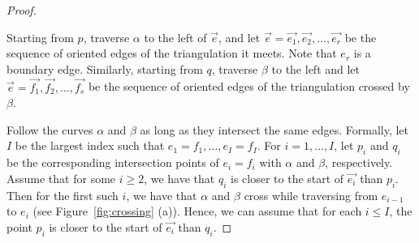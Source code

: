 \documentclass[11pt]{amsart}
\theoremstyle{definition}
\begin{document}
\begin{proof}
\begin{minipage}[t]{0.3\textwidth}
\endgroup

\label{fig:crossing}
\end{minipage}\hfill
\begin{minipage}[t]{0.65\textwidth}
\setlength{\parskip}{0pt}
\setlength{\parindent}{\normalparindent}\indent
Starting from $p$, traverse $\alpha$ to the left of $\vec{e}$, and let $\vec{e}=\vec{e_1}, \vec{e_2}, \dots, \vec{e_r}$ be the sequence of oriented edges of the triangulation it meets. Note that $e_r$ is a boundary edge.  
Similarly, starting from $q$, traverse $\beta$ to the left and let $\vec{e}=\vec{f_1}, \vec{f_2}, \dots, \vec{f_s}$ be the sequence of oriented edges of the triangulation crossed by $\beta$.

Follow the curves $\alpha$ and $\beta$ as long as they intersect the same edges. Formally, let $I$ be the largest index such that $e_1=f_1,\dots,e_I=f_I$. For $i=1,\dots,I$, let $p_i$ and $q_i$ be the corresponding intersection points of $e_i=f_i$ with $\alpha$ and $\beta$, respectively.  Assume that for some  $i \geq 2$, we have that $q_i$ is closer to the start of $\vec{e_i}$ than $p_i$. Then for the first  such $i$, we have that $\alpha$ and $\beta$ cross while traversing from $e_{i-1}$ to $e_i$ (see Figure~\ref{fig:crossing} (a)).
Hence, we can assume that for each $i\leq I$, the point $p_i$ is closer to the start of $\vec{e_i}$ than $q_i$.


\end{minipage}
\end{proof}
\end{document}
